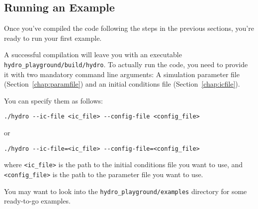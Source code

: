 






\subsection{Running an Example}


Once you've compiled the code following the steps in the previous sections,
you're ready to run your first example.

A successful compilation will leave you with an executable
\verb|hydro_playground/build/hydro|. To actually run the code, you need to
provide it with two mandatory command line arguments: A simulation parameter
file (Section~\ref{chap:paramfile}) and an initial conditions file
(Section~\ref{chap:icfile}).

You can specify them as follows:

\begin{lstlisting}
./hydro --ic-file <ic_file> --config-file <config_file>
\end{lstlisting}

or

\begin{lstlisting}
./hydro --ic-file=<ic_file> --config-file=<config_file>
\end{lstlisting}

where \verb|<ic_file>| is the path to the initial conditions file you want to
use, and \verb|<config_file>| is the path to the parameter file you want to use.

You may want to look into the \verb|hydro_playground/examples| directory for
some ready-to-go examples.



